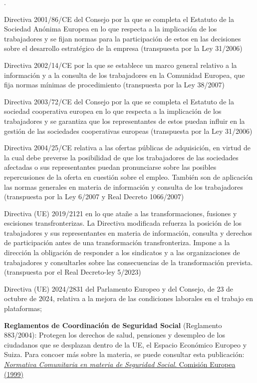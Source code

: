 \documentclass[10pt,a4paper]{article}
\newcounter{numitem}
\newenvironment{lnum}
      {\begin{list}{\arabic{numitem}.}{%
          \usecounter{numitem}%
          \setlength{\leftmargin}{1cm}%
          \setlength{\parskip}{3pt}%
          \setlength{\itemsep}{0pt}%
          \setlength{\parsep}{0pt}%
      }}
      {\end{list}}
\begin{document}
\begin{lnum}
    \item Directiva 2001/86/CE del Consejo por la que se completa el Estatuto de la Sociedad Anónima Europea en lo que respecta a la implicación de los trabajadores y se fijan normas para la participación de estos en las decisiones sobre el desarrollo estratégico de la empresa (transpuesta por la Ley 31/2006)
    \item Directiva 2002/14/CE por la que se establece un marco general relativo a la información y a la consulta de los trabajadores en la Comunidad Europea, que fija normas mínimas de procedimiento (transpuesta por la Ley 38/2007)
    \item Directiva 2003/72/CE del Consejo por la que se completa el Estatuto de la sociedad cooperativa europea en lo que respecta a la implicación de los trabajadores y se garantiza que los representantes de estos puedan influir en la gestión de las sociedades cooperativas europeas (transpuesta por la Ley 31/2006)
    \item Directiva 2004/25/CE relativa a las ofertas públicas de adquisición, en virtud de la cual debe preverse la posibilidad de que los trabajadores de las sociedades afectadas o sus representantes puedan pronunciarse sobre las posibles repercusiones de la oferta en cuestión sobre el empleo. También son de aplicación las normas generales en materia de información y consulta de los trabajadores (transpuesta por la Ley 6/2007 y Real Decreto 1066/2007)
    \item Directiva (UE) 2019/2121 en lo que atañe a las transformaciones, fusiones y escisiones transfronterizas. La Directiva modificada refuerza la posición de los trabajadores y sus representantes en materia de información, consulta y derechos de participación antes de una transformación transfronteriza. Impone a la dirección la obligación de responder a los sindicatos y a las organizaciones de trabajadores y consultarles sobre las consecuencias de la transformación prevista. (transpuesta por el Real Decreto-ley 5/2023)
    \item Directiva (UE) 2024/2831 del Parlamento Europeo y del Consejo, de 23 de octubre de 2024, relativa a la mejora de las condiciones laborales en el trabajo en plataformas;
    \item \textbf{Reglamentos de Coordinación de Seguridad Social} (Reglamento 883/2004): Protegen los derechos de salud, pensiones y desempleo de los ciudadanos que se desplazan dentro de la UE, el Espacio Económico Europeo y Suiza. Para concoer más sobre la materia, se puede consultar esta publicación: \href{https://ec.europa.eu/employment_social/soc-prot/schemes/guide_es.pdf}{\textit{Normativa Comunitaria en materia de Seguridad Social}. Comisión Europea (1999)}

\end{lnum}
\end{document}
